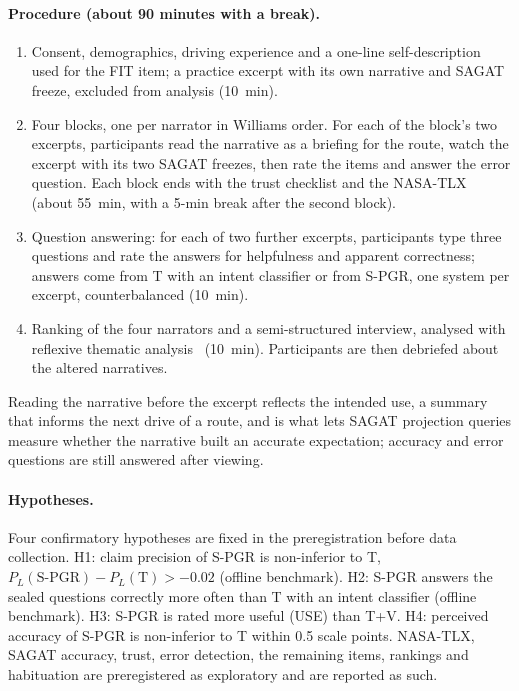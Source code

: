\paragraph{Procedure (about 90 minutes with a break).}
\begin{enumerate}
\item Consent, demographics, driving experience and a one-line self-description used for the FIT item; a practice excerpt with its own narrative and SAGAT freeze, excluded from analysis (10~min).
\item Four blocks, one per narrator in Williams order. For each of the block's two excerpts, participants read the narrative as a briefing for the route, watch the excerpt with its two SAGAT freezes, then rate the items and answer the error question. Each block ends with the trust checklist and the NASA-TLX (about 55~min, with a 5-min break after the second block).
\item Question answering: for each of two further excerpts, participants type three questions and rate the answers for helpfulness and apparent correctness; answers come from T with an intent classifier or from S-PGR, one system per excerpt, counterbalanced (10~min).
\item Ranking of the four narrators and a semi-structured interview, analysed with reflexive thematic analysis~\cite{braun2006thematic} (10~min). Participants are then debriefed about the altered narratives.
\end{enumerate}
Reading the narrative before the excerpt reflects the intended use, a summary that informs the next drive of a route, and is what lets SAGAT projection queries measure whether the narrative built an accurate expectation; accuracy and error questions are still answered after viewing.

\paragraph{Hypotheses.}
Four confirmatory hypotheses are fixed in the preregistration before data collection.
H1: claim precision of S-PGR is non-inferior to T, $P_L(\text{S-PGR})-P_L(\text{T})>-0.02$ (offline benchmark).
H2: S-PGR answers the sealed questions correctly more often than T with an intent classifier (offline benchmark).
H3: S-PGR is rated more useful (USE) than T+V.
H4: perceived accuracy of S-PGR is non-inferior to T within 0.5 scale points.
NASA-TLX, SAGAT accuracy, trust, error detection, the remaining items, rankings and habituation are preregistered as exploratory and are reported as such.


